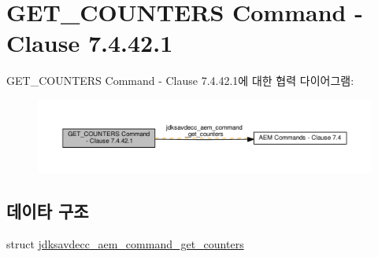 \hypertarget{group__command__get__counters}{}\section{G\+E\+T\+\_\+\+C\+O\+U\+N\+T\+E\+RS Command -\/ Clause 7.4.42.1}
\label{group__command__get__counters}
G\+E\+T\+\_\+\+C\+O\+U\+N\+T\+E\+RS Command -\/ Clause 7.4.42.1에 대한 협력 다이어그램\+:
\nopagebreak
\begin{figure}[H]
\begin{center}
\leavevmode
\includegraphics[width=350pt]{group__command__get__counters}
\end{center}
\end{figure}
\subsection*{데이타 구조}
\begin{DoxyCompactItemize}
\item 
struct \hyperlink{structjdksavdecc__aem__command__get__counters}{jdksavdecc\+\_\+aem\+\_\+command\+\_\+get\+\_\+counters}
\end{DoxyCompactItemize}
